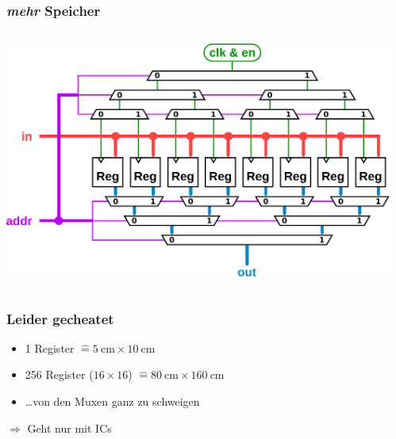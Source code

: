 \documentclass[t,aspectratio=169,usenames,dvipsnames]{beamer}
\begin{document}
\begin{frame}
  \frametitle{\emph{mehr} Speicher}

  \begin{columns}
    \begin{column}{.7\textwidth}
      \includegraphics[width=\textwidth]{memory.pdf}
    \end{column}
    \begin{column}{.25\textwidth}
    \end{column}
  \end{columns}

\end{frame}

\begin{frame}
  \frametitle{Leider gecheatet}

  \begin{itemize}
  \item 1 Register ${} \mathrel{\hat=} \qty{5}{\centi\metre} \times \qty{10}{\centi\metre}$
  \item 256 Register ($16 \times 16$) ${} \mathrel{\hat=} \qty{80}{\centi\metre} \times \qty{160}{\centi\metre}$
  \item \ldots von den Muxen ganz zu schweigen
  \end{itemize}

  \bigskip

  $\Rightarrow$ Geht nur mit ICs

\end{frame}
\end{document}
